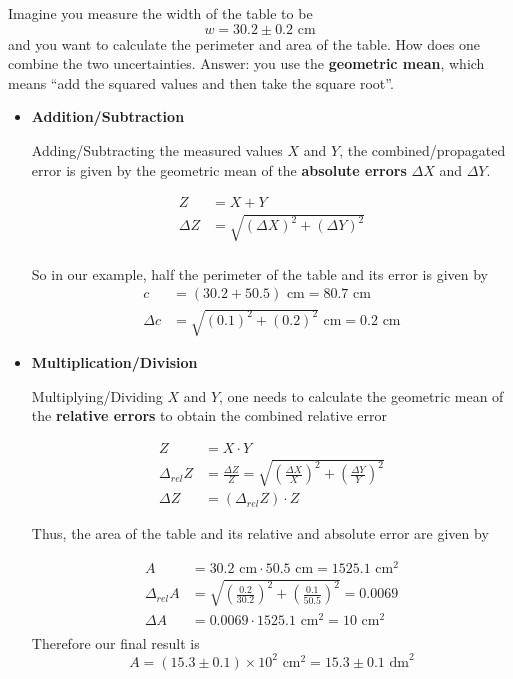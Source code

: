 \documentclass[a4paper,10pt]{article}
\begin{document}
Imagine you measure the width of the table to be 
\[
 w = 30.2 \pm 0.2 \text{ cm}
\]
and you want to calculate the perimeter and area of the table. How does one combine the two uncertainties. Answer: you use the 
\textbf{geometric mean}, which means ``add the squared values and then take the square root''. 
\begin{itemize} 
 \item \textbf{Addition/Subtraction}
 
 Adding/Subtracting the measured values $X$ and $Y$, the combined/propagated error 
 is given by the geometric mean of the \textbf{absolute errors} $\Delta X$ and $\Delta Y$.
 
 \begin{align*}
  Z &= X+Y \\
  \Delta Z &= \sqrt{(\Delta X)^2 + (\Delta Y)^2} \\  
 \end{align*}
 
 So in our example, half the perimeter of the table and its error is given by
 \begin{align*}
  c &= (30.2 + 50.5) \text{ cm} = 80.7 \text{ cm} \\
  \Delta c &= \sqrt{(0.1)^2+(0.2)^2} \text{ cm}= 0.2 \text{ cm}
 \end{align*}

  \item \textbf{Multiplication/Division}
  
  Multiplying/Dividing $X$ and $Y$, one needs to calculate the geometric mean of the \textbf{relative errors} to obtain the 
  combined relative error
  
  \begin{align*}
  Z &= X \cdot Y \\
  \Delta_{rel} Z &= \frac{\Delta Z}{Z} = \sqrt{\left(\frac{\Delta X}{X}\right)^2 + \left(\frac{\Delta Y}{Y}\right)^2} \\  
  \Delta Z &= (\Delta_{rel}Z) \cdot Z
  \end{align*}
  
  Thus, the area of the table and its relative and absolute error are given by
  
  \begin{align*}
  A &=  30.2 \text{ cm}  \cdot 50.5 \text{ cm} = 1525.1 \text{ cm}^2 \\
  \Delta_{rel} A &= \sqrt{\left(\frac{0.2}{30.2}\right)^2 + \left(\frac{0.1}{50.5}\right)^2} = 0.0069 \\ 
  \Delta A &= 0.0069 \cdot 1525.1 \text{ cm} ^2 = 10 \text{ cm} ^2   \\
  \end{align*}
  Therefore our final result is 
  \[
   A = (15.3 \pm 0.1) \times 10^{2} \text{ cm}^2 = 15.3 \pm 0.1 \text{ dm}^2
  \]
  

\end{itemize}
\end{document}
